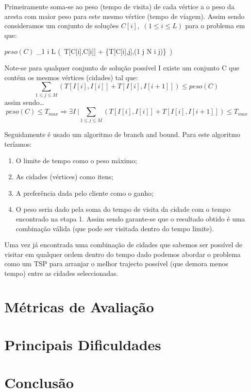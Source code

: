 \documentclass[12pt,a4paper,reqno]{report}
\numberwithin{figure}{section}
\numberwithin{equation}{section}
\begin{document}
Primeiramente soma-se ao peso (tempo de visita) de cada vértice a o peso da
aresta com maior peso para este mesmo vértice (tempo de viagem). Assim sendo
consideramos um conjunto de soluções $C[i]$,~$(1 \leq i \leq L)$ para o problema
em que:
\begin{center}
$peso(C)$ \equiv \sum_{1 \leq i \leq L} (~T[C[i],C[i]] + \max
\{T[C[i],j],(1 \leq j \leq N \wedge i \neq j)\}~)

Note-se para qualquer conjunto de solução possível I existe um conjunto C que
contém os mesmos vértices (cidades) tal que:
\begin{equation}
		\sum_{1 \leq j \leq M}
		(T[I[i],I[i]] + T[I[i],I[i+1]]) \leq peso(C)
\end{equation}
assim sendo\ldots 
\begin{equation}
		peso(C) \leq T_{max} \Rightarrow \exists I~| \sum_{1 \leq j \leq M}
		(T[I[i],I[i]] + T[I[i],I[i+1]]) \leq T_{max}
\end{equation}
\end{center}
Seguidamente é usado um algoritmo de branch and bound. Para este algoritmo teríamos:
\begin{enumerate}
	\item O limite de tempo como o peso máximo;
	\item As cidades (vértices) como itens;
	\item A preferência dada pelo cliente como o ganho;
	\item O peso seria dado pela soma do tempo de visita da cidade com o tempo
encontrado na etapa 1. Assim sendo garante-se que o resultado obtido é uma combinação válida (que pode ser visitada dentro do tempo limite).
\end{enumerate}


Uma vez já encontrada uma combinação de cidades que sabemos ser possível de visitar em qualquer ordem dentro do tempo dado podemos abordar o problema como um TSP para arranjar o melhor trajecto possível (que demora menos tempo) entre as cidades seleccionadas.


\chapter{Métricas de Avaliação}

\chapter{Principais Dificuldades}



\chapter{Conclusão}
\end{document}
